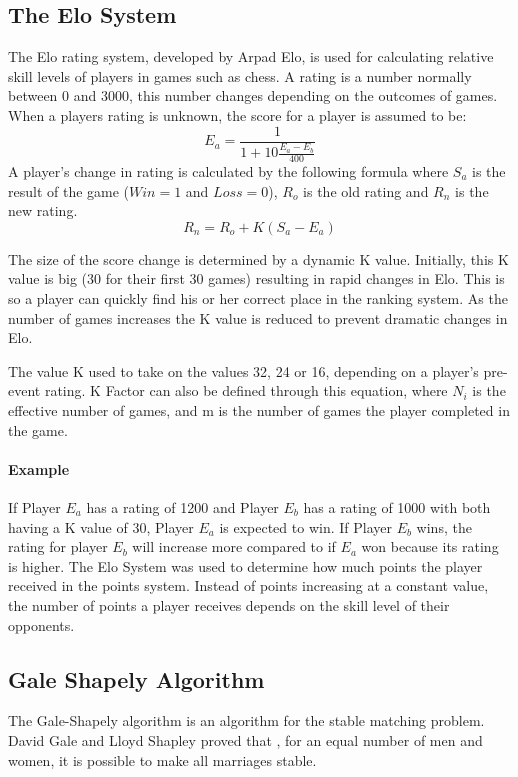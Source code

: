\subsection{The Elo System}
The Elo rating system, developed by Arpad Elo, is used for calculating relative skill levels of players in games such as chess.\cite{glickman1999rating} A rating is a number normally between 0 and 3000, this number changes depending on the outcomes of games. When a players rating is unknown, the score for a player is assumed to be:
\[ E_a = \frac{1}{1+10\frac{E_a-E_b}{400}} \] \cite{pelanek2014application} A player's change in rating is calculated by the following formula where ${S_a}$ is the result of the game (${Win = 1}$ and $Loss = 0$), $R_o$ is the old rating and $R_n$ is the new rating.
\[ R_n = R_o + K(S_a - E_a) \]


{\raggedright The size of the score change is determined by a dynamic K value. Initially, this K value is big (30 for their first 30 games) resulting in rapid changes in Elo. This is so a player can quickly find his or her correct place in the ranking system. As the number of games increases the K value is reduced to prevent dramatic changes in Elo.}\newline
\cite{glickmanrating} The value K used to take on the values 32, 24 or 16, depending on a player’s pre-event rating. K Factor can also be defined through this equation, where $N_i$ is the effective number of games, and m is the number of games the player completed in the game.
\paragraph{Example} If Player $E_a$ has a rating of 1200 and Player $E_b$ has a rating of 1000 with both having a K value of 30, Player $E_a$ is expected to win. If Player $E_b$ wins, the rating for player $E_b$ will increase more compared to if $E_a$ won because its rating is higher.\hfill \break
The Elo System was used to determine how much points the player received in the points system. Instead of points increasing at a constant value, the number of points a player receives depends on the skill level of their opponents.

\subsection{Gale Shapely Algorithm}
The Gale-Shapely algorithm \cite{dubins1981machiavelli} is an algorithm for the stable matching problem. \cite{gale1985some}
David Gale and Lloyd Shapley proved that \cite{gale1962college}, for an equal number of men and women, it is possible to make all marriages stable. 

